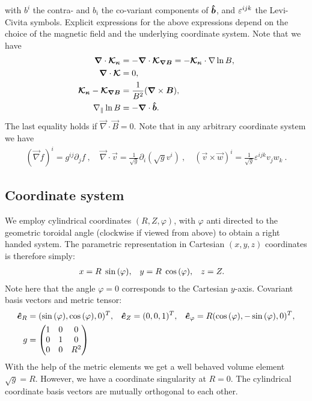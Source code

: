 with $b^i$ the contra- and $b_i$ the co-variant components of $\bm{\hat{b}}$, and
$\varepsilon^{ijk}$ the Levi-Civita symbols.
Explicit expressions for the above expressions
depend on the choice of the magnetic field and the underlying coordinate system.
Note that we have
\begin{align}
    {\boldsymbol{\nabla}} \cdot {\boldsymbol{\mathcal K_\kappa}}
    &= -{\boldsymbol{\nabla}} \cdot {\boldsymbol{\mathcal K_{\nabla B}}} = -{\boldsymbol{ \mathcal K_\kappa}}\cdot\nabla\ln B, \\
    {\boldsymbol{\nabla}}\cdot{\boldsymbol{ \mathcal K}} &= 0, \\
    {\boldsymbol{ \mathcal K_\kappa}} - {\boldsymbol{ \mathcal K_{\nabla B}}} &= \frac{1}{B^2} ({\boldsymbol{\nabla}} \times {\boldsymbol{B}}), \\
    \nabla_\parallel \ln B &= -{\boldsymbol{\nabla}}\cdot\bm{\hat{b}}.
    \label{eq:curl_curvature}
\end{align}
The last equality holds if $\vec\nabla\cdot \vec B = 0$.
Note that in any arbitrary coordinate system we have
\begin{align}
(\vec \nabla f)^i = g^{ij}\partial_j f ~, \quad
\vec \nabla \cdot \vec v = \frac{1}{\sqrt{g}}\partial_i \left(\sqrt{g} v^i\right) ~, \quad
(\vec v \times \vec w)^i = \frac{1}{\sqrt{g}}\varepsilon^{ijk} v_jw_k ~.
\end{align}

\subsection{Coordinate system}\label{sec:cylmetric}
We employ cylindrical coordinates \( (R,Z,\varphi) \), with \(\varphi\) anti directed to the geometric toroidal angle (clockwise if viewed from above) to
obtain a right handed system. The parametric representation in Cartesian \((x,y,z)\) coordinates is therefore simply:
\begin{align}
 x &= R \hspace{1 mm} \sin{(\varphi)}, &
 y &= R \hspace{1 mm} \cos{(\varphi)}, &
 z &= Z .
\end{align}
Note here that the angle $\varphi = 0$ corresponds to the Cartesian $y$-axis.
Covariant
basis vectors and metric tensor:
\begin{align}
 \bm{\hat{e}}_R      &= (\sin{(\varphi)} ,   \cos{(\varphi)},0)^T, &
 \bm{\hat{e}}_Z      &= ( 0 ,0 ,1 )^T, &
 \bm{\hat{e}}_{\varphi} &= R ( \cos{(\varphi)} , -\sin{(\varphi)} , 0 )^T,
\\
 g &= \begin{pmatrix}
  1 & 0 & 0 \\
  0 & 1 & 0 \\
  0 & 0 & R^2
   \end{pmatrix}
\end{align}
With the help of the metric elements we get a well behaved volume element \(\sqrt{g} = R\). However, we have a coordinate singularity at \(R=0\).
The cylindrical coordinate basis vectors are mutually orthogonal to each other.

